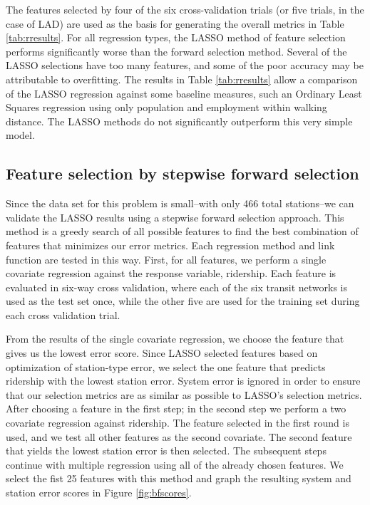 \documentclass[11pt]{article}
\begin{document}
The features selected by four of the six cross-validation trials (or five trials, in the case of LAD) are used as the basis for generating the overall metrics in Table \ref{tab:rresults}. For all regression types, the LASSO method of feature selection performs significantly worse than the forward selection method. Several of the LASSO selections have too many features, and some of the poor accuracy may be attributable to overfitting. The results in Table \ref{tab:rresults} allow a comparison of the LASSO regression against some baseline measures, such an Ordinary Least Squares regression using only population and employment within walking distance. The LASSO methods do not significantly outperform this very simple model.


\subsection{Feature selection by stepwise forward selection}\label{sec:fs}


Since the data set for this problem is small--with only 466 total stations--we can validate the LASSO results using a stepwise forward selection approach. This method is a greedy search of all possible features to find the best combination of features that minimizes our error metrics. Each regression method and link function are tested in this way. First, for all features, we perform a single covariate regression against the response variable, ridership. Each feature is evaluated in six-way cross validation, where each of the six transit networks is used as the test set once, while the other five are used for the training set during each cross validation trial.

From the results of the single covariate regression, we choose the feature that gives us the lowest error score. Since LASSO selected features based on optimization of station-type error, we select the one feature that predicts ridership with the lowest station error. System error is ignored in order to ensure that our selection metrics are as similar as possible to LASSO's selection metrics. After choosing a feature in the first step; in the second step we perform a two covariate regression against ridership. The feature selected in the first round is used, and we test all other features as the second covariate. The second feature that yields the lowest station error is then selected. The subsequent steps continue with multiple regression using all of the already chosen features. We select the fist 25 features with this method and graph the resulting system and station error scores in Figure \ref{fig:bfscores}. 
\end{document}
